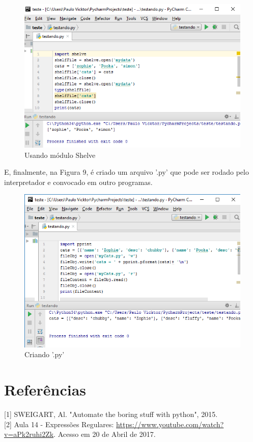 \documentclass[12pt, a4paper, twocolumn]{article}
\begin{document}
\begin{figure}[htb!]
	\centering
	\includegraphics[scale = 0.47] {imagem4.png}
	\caption{Usando módulo Shelve}
\end{figure}

E, finalmente, na Figura 9, é criado um arquivo '.py' que pode ser rodado pelo interpretador e convocado em outro programas.

\begin{figure}[htb!]
	\centering
	\includegraphics[scale = 0.5] {imagem5.png}
	\caption{Criando '.py'}
\end{figure}

\pagebreak
\section{Referências}
[1] SWEIGART, Al. "Automate the boring stuff with python", 2015. \\

[2] Aula 14 - Expressões Regulares: \url{https://www.youtube.com/watch?v=aPk2ruhi2Zk}. Acesso em 20 de Abril de 2017.
\end{document}
